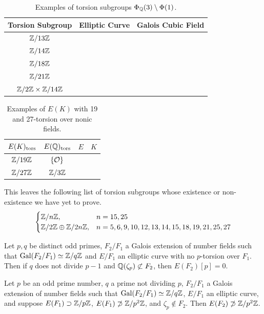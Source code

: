 \begin{frame}[plain]
	\begin{table}[!ht]
	\centering
	\caption{Examples of torsion subgroups $\Phi_{\mathbb{Q}}(3) \setminus \Phi(1)$.\label{tab:3qsm1}}
	\begin{tabular}{ccc} \hline
	Torsion Subgroup & Elliptic Curve & Galois Cubic Field \\ \hline
	$\mathbb{Z}/13\mathbb{Z}$ & \ofsbo{} & \qzetasp{} \\
	$\mathbb{Z}/14\mathbb{Z}$ & \fnat{} & \qzetasp{} \\
	$\mathbb{Z}/18\mathbb{Z}$ & \ofaf{} & \qzetasp{} \\
	$\mathbb{Z}/21\mathbb{Z}$ & \ostbo{} & \qzetanp{} \\
	$\mathbb{Z}/2\mathbb{Z} \times \mathbb{Z}/14\mathbb{Z}$ & \onttco{} & \ttnsoo{}
	\end{tabular}
	\end{table}

        \begin{table}[!ht]
        \centering
        \caption{Examples of $E(K)$ with 19 and 27-torsion over nonic fields.\label{tab:1927tor}}
        \begin{tabular}{cccc} \hline
        $E(K)_{\text{tors}}$ & $E(\mathbb{Q})_{\text{tors}}$ &  $E$ & $K$ \\ \hline
        $\mathbb{Z}/19\mathbb{Z}$ & $\{ \mathcal{O} \}$ & \tsoao{} & \qzetantp{} \\ 
        $\mathbb{Z}/27\mathbb{Z}$ & $\mathbb{Z}/3\mathbb{Z}$ & \tsaf{} & \qzetatsp{}
        \end{tabular}
        \end{table}
\end{frame}



\begin{frame}[plain]
This leaves the following list of torsion subgroups whose existence or non-existence we have yet to prove. \pspace
	\[
	\begin{cases}
	\mathbb{Z}/n\mathbb{Z}, & n= 15, 25 \\
	\mathbb{Z}/2\mathbb{Z} \oplus \mathbb{Z}/2n\mathbb{Z}, & n= 5, 6, 9, 10, 12, 13, 14, 15, 18, 19, 21, 25, 27
	\end{cases}
	\]
\end{frame}



\begin{frame}[plain]
\begin{lem}[Najman, 2015]
Let $p, q$ be distinct odd primes, $F_2/F_1$ a Galois extension of number fields such that $\operatorname{Gal}(F_2/F_1) \simeq \mathbb{Z}/q\mathbb{Z}$ and $E/F_1$ an elliptic curve with no $p$-torsion over $F_1$. Then if $q$ does not divide $p-1$ and $\mathbb{Q}(\zeta_p) \not\subset F_2$, then $E(F_2)[p]=0$. 
\end{lem}

\begin{lem}[Najman, 2015]
Let $p$ be an odd prime number, $q$ a prime not dividing $p$, $F_2/F_1$ a Galois extension of number fields such that $\operatorname{Gal}(F_2/F_1) \simeq \mathbb{Z}/q\mathbb{Z}$, $E/F_1$ an elliptic curve, and suppose $E(F_1) \supset \mathbb{Z}/p\mathbb{Z}$, $E(F_1) \not\supset \mathbb{Z}/p^2\mathbb{Z}$, and $\zeta_p \notin F_2$. Then $E(F_2) \not\supset \mathbb{Z}/p^2\mathbb{Z}$.
\end{lem} 
\end{frame}



